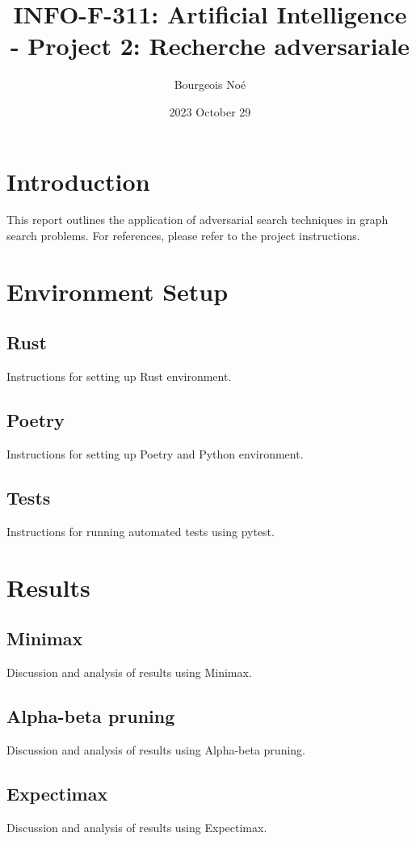 \documentclass{article}
\title{INFO-F-311: Artificial Intelligence - Project 2: Recherche adversariale}
\author{Bourgeois Noé}
\date{2023 October 29}
\begin{document}
\maketitle

\tableofcontents

\newpage
\section{Introduction}
This report outlines the application of adversarial search techniques in graph search problems. For references, please refer to the project instructions.

\section{Environment Setup}
\subsection{Rust}
Instructions for setting up Rust environment.

\subsection{Poetry}
Instructions for setting up Poetry and Python environment.

\subsection{Tests}
Instructions for running automated tests using pytest.

\newpage
\section{Results}
\subsection{Minimax}
Discussion and analysis of results using Minimax.

\subsection{Alpha-beta pruning}
Discussion and analysis of results using Alpha-beta pruning.

\subsection{Expectimax}
Discussion and analysis of results using Expectimax.
\end{document}
